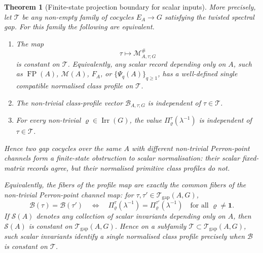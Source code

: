 \documentclass[11pt,a4paper]{amsart}
\theoremstyle{plain}
\newtheorem{theorem}{Theorem}[section]
\theoremstyle{definition}
\theoremstyle{remark}
\DeclareMathOperator{\Irr}{Irr}
\DeclareMathOperator{\FP}{FP}
\begin{document}
\begin{theorem}[Finite-state projection boundary for scalar inputs]
  More precisely, let \(\mathscr T\) be any
  non-empty family of cocycles \(E_A\to G\) satisfying the twisted
  spectral gap. For this family the following are equivalent.
  \begin{enumerate}[label=\textup{(\roman*)}]
    \item The map
      \[
        \tau\longmapsto \mathcal M^\#_{A,\tau;G}
      \]
      is constant on \(\mathscr T\). Equivalently, any scalar record
      depending only on \(A\), such as
      \(\FP(A)\), \(\mathcal M(A)\), \(F_A\), or
      \(\{\Psi_q(A)\}_{q\ge1}\), has a well-defined single compatible
      normalised class profile on \(\mathscr T\).
    \item The non-trivial class-profile vector
      \(\mathcal B_{A,\tau;G}\) is independent of
      \(\tau\in\mathscr T\).
    \item For every non-trivial \(\varrho\in\Irr(G)\), the value
      \(\Pi_\varrho^\tau(\lambda^{-1})\) is independent of
      \(\tau\in\mathscr T\).
  \end{enumerate}
  Hence two gap cocycles over the same \(A\) with different non-trivial
  Perron-point channels form a finite-state obstruction to scalar
  normalisation: their scalar fixed-matrix records agree, but their
  normalised primitive class profiles do not.

  Equivalently, the fibers of the profile map are exactly the common
  fibers of the non-trivial Perron-point channel map:
  for \(\tau,\tau'\in\mathcal T_{\mathrm{gap}}(A,G)\),
  \begin{equation}\label{eq:scalar-profile-fibers}
    \mathcal B(\tau)=\mathcal B(\tau')
    \quad\Longleftrightarrow\quad
    \Pi_\varrho^\tau(\lambda^{-1})
    =
    \Pi_\varrho^{\tau'}(\lambda^{-1})
    \quad\text{for all }\varrho\neq\mathbf 1.
  \end{equation}
  If \(\mathcal S(A)\) denotes any collection of scalar invariants
  depending only on \(A\), then \(\mathcal S(A)\) is constant on
  \(\mathcal T_{\mathrm{gap}}(A,G)\). Hence on a subfamily
  \(\mathscr T\subset\mathcal T_{\mathrm{gap}}(A,G)\), such scalar
  invariants identify a single normalised class profile precisely when
  \(\mathcal B\) is constant on \(\mathscr T\).
\end{theorem}
\end{document}
